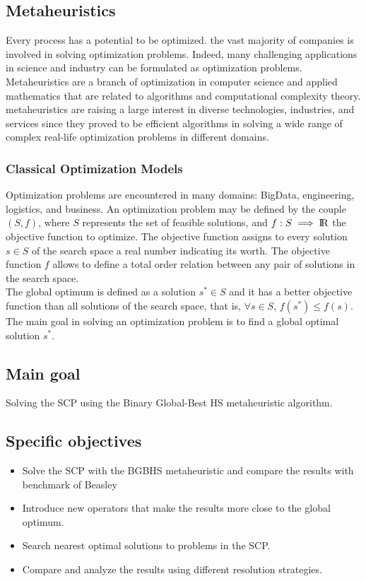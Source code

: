 \subsection{Metaheuristics}
Every process has a potential to be optimized. the vast majority of companies is involved in solving optimization problems. Indeed, many challenging applications in science and industry can be formulated as optimization problems.
Metaheuristics are a branch of optimization in computer science and applied mathematics
that are related to algorithms and computational complexity theory. metaheuristics are raising a large interest in diverse technologies, industries, and services since they proved to be efficient algorithms in solving a wide range of  complex real-life optimization problems in different domains.

\subsubsection{Classical Optimization Models}
Optimization problems are encountered in many domains: BigData, engineering, logistics, and business. An optimization problem may be defined by the couple $(S, f )$, where $S$ represents the set of feasible solutions, and $f : S \implies {\rm I\!R}$ the objective function to optimize. The objective function assigns to every solution
$s \in S$ of the search space a real number indicating its worth. The objective function
$f$ allows to define a total order relation between any pair of solutions in the search
space.\\

The global optimum is defined as  a solution $s^* \in S$ and it has a better objective function than all solutions of the search space, that is, $\forall  s \in  S$, $f(s^*) 	\leq f(s)$.\\

The main goal in solving an optimization problem is to find a global optimal solution $s^*$.

\subsection{Main goal}
Solving the SCP using the Binary Global-Best HS metaheuristic algorithm.

\subsection{Specific objectives}
\begin{itemize}
\item Solve the SCP with the BGBHS metaheuristic and compare the results with benchmark of Beasley	\cite{citeulike:921349}	
\item Introduce new operators that make the results more close to the global optimum.
\item Search nearest optimal solutions to problems in the SCP.
\item Compare and analyze the results using different resolution strategies.
\end{itemize}





